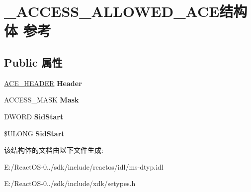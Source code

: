 \hypertarget{struct___a_c_c_e_s_s___a_l_l_o_w_e_d___a_c_e}{}\section{\+\_\+\+A\+C\+C\+E\+S\+S\+\_\+\+A\+L\+L\+O\+W\+E\+D\+\_\+\+A\+C\+E结构体 参考}
\label{struct___a_c_c_e_s_s___a_l_l_o_w_e_d___a_c_e}
\subsection*{Public 属性}
\begin{DoxyCompactItemize}
\item 
\mbox{\label{struct___a_c_c_e_s_s___a_l_l_o_w_e_d___a_c_e_a244f592fe48cdabf8b554866828ae52e}} 
\hyperlink{struct___a_c_e___h_e_a_d_e_r}{A\+C\+E\+\_\+\+H\+E\+A\+D\+ER} {\bfseries Header}
\item 
\mbox{\label{struct___a_c_c_e_s_s___a_l_l_o_w_e_d___a_c_e_ab69fb4396442d2ba0c68cc69a2286388}} 
A\+C\+C\+E\+S\+S\+\_\+\+M\+A\+SK {\bfseries Mask}
\item 
\mbox{\label{struct___a_c_c_e_s_s___a_l_l_o_w_e_d___a_c_e_a35f4f724857c345ae021c05c7b22388f}} 
D\+W\+O\+RD {\bfseries Sid\+Start}
\item 
\mbox{\label{struct___a_c_c_e_s_s___a_l_l_o_w_e_d___a_c_e_a11a99681757cbd745040711021e65072}} 
\$U\+L\+O\+NG {\bfseries Sid\+Start}
\end{DoxyCompactItemize}


该结构体的文档由以下文件生成\+:\begin{DoxyCompactItemize}
\item 
E\+:/\+React\+O\+S-\/0../sdk/include/reactos/idl/ms-\/dtyp.\+idl\item 
E\+:/\+React\+O\+S-\/0../sdk/include/xdk/setypes.\+h\end{DoxyCompactItemize}
